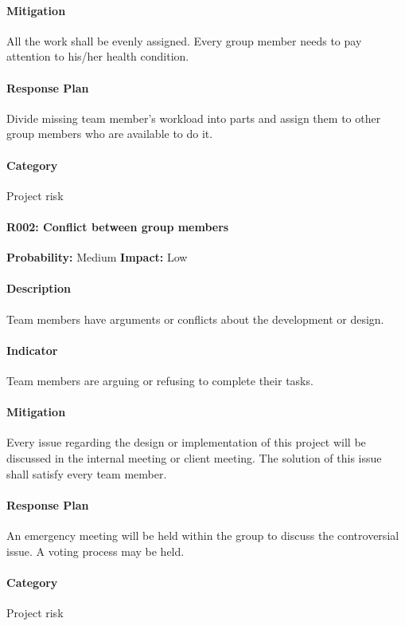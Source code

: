 \documentclass[11pt, a4paper]{report}
\begin{document}
	\paragraph{Mitigation}All the work shall be evenly assigned. Every group member needs to pay attention to his/her health condition.
	\paragraph{Response Plan}Divide missing team member's workload into parts and assign them to other group members who are available to do it. \\
	\paragraph{Category} Project risk

	\paragraph{R002: Conflict between group members} \hspace{1cm} \textbf{Probability: }Medium\hspace{1cm}   \textbf{Impact: }Low
	\paragraph{Description}Team members have arguments or conflicts about the development or design.
	\paragraph{Indicator}Team members are arguing or refusing to complete their tasks.
	\paragraph{Mitigation}Every issue regarding the design or implementation of this project will be discussed in the internal meeting or client meeting. The solution of this issue shall satisfy every team member.
	\paragraph{Response Plan}An emergency meeting will be held within the group to discuss the controversial issue. A voting process may be held.\\
	\paragraph{Category} Project risk
	
\end{document}
